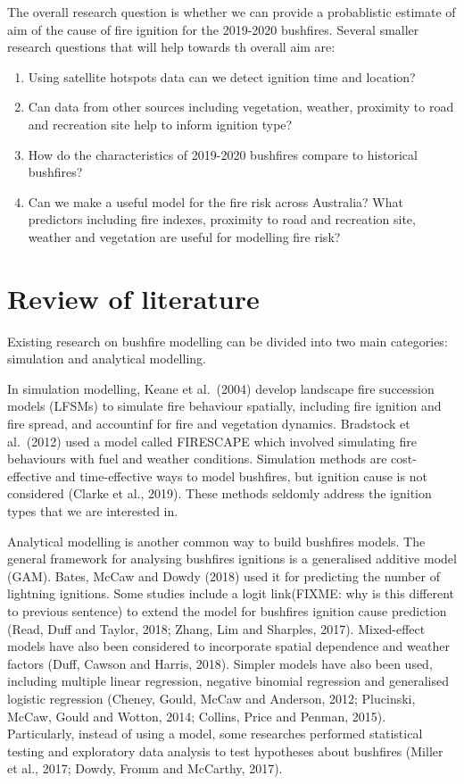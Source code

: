 \documentclass[11pt,a4paper,]{article}
\providecommand{\tightlist}{%
  \setlength{\itemsep}{0pt}\setlength{\parskip}{0pt}}
\begin{document}
The overall research question is whether we can provide a probablistic estimate of aim of the cause of fire ignition for the 2019-2020 bushfires. Several smaller research questions that will help towards th overall aim are:

\begin{enumerate}
\def\labelenumi{\arabic{enumi}.}
\tightlist
\item
  Using satellite hotspots data can we detect ignition time and location?
\item
  Can data from other sources including vegetation, weather, proximity to road and recreation site help to inform ignition type?
\item
  How do the characteristics of 2019-2020 bushfires compare to historical bushfires?
\item
  Can we make a useful model for the fire risk across Australia? What predictors including fire indexes, proximity to road and recreation site, weather and vegetation are useful for modelling fire risk?
\end{enumerate}

\hypertarget{review-of-literature}{%
\section{Review of literature}\label{review-of-literature}}

Existing research on bushfire modelling can be divided into two main categories: simulation and analytical modelling.

In simulation modelling, Keane et al.~(2004) develop landscape fire succession models (LFSMs) to simulate fire behaviour spatially, including fire ignition and fire spread, and accountinf for fire and vegetation dynamics. Bradstock et al.~(2012) used a model called FIRESCAPE which involved simulating fire behaviours with fuel and weather conditions. Simulation methods are cost-effective and time-effective ways to model bushfires, but ignition cause is not considered (Clarke et al., 2019). These methods seldomly address the ignition types that we are interested in.

Analytical modelling is another common way to build bushfires models. The general framework for analysing bushfires ignitions is a generalised additive model (GAM). Bates, McCaw and Dowdy (2018) used it for predicting the number of lightning ignitions. Some studies include a logit link(FIXME: why is this different to previous sentence) to extend the model for bushfires ignition cause prediction (Read, Duff and Taylor, 2018; Zhang, Lim and Sharples, 2017). Mixed-effect models have also been considered to incorporate spatial dependence and weather factors (Duff, Cawson and Harris, 2018). Simpler models have also been used, including multiple linear regression, negative binomial regression and generalised logistic regression (Cheney, Gould, McCaw and Anderson, 2012; Plucinski, McCaw, Gould and Wotton, 2014; Collins, Price and Penman, 2015). Particularly, instead of using a model, some researches performed statistical testing and exploratory data analysis to test hypotheses about bushfires (Miller et al., 2017; Dowdy, Fromm and McCarthy, 2017).
\end{document}
